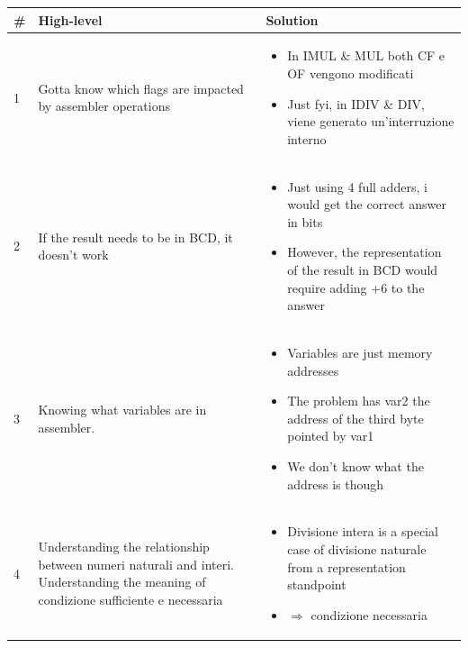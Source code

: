 \documentclass[a4paper,12pt]{article}
\begin{document}
\noindent\hspace*{-1.5cm}
    \begin{tabular}{|C{0.7cm}|C{8cm}|C{8cm}|}
        \hline
        \textbf{\#} & \textbf{High-level} & \textbf{Solution} \\
        \hline

        1
        &
        Gotta know which flags are impacted by assembler operations
        &
        \begin{itemize}[label=\(\rightarrow\)]
            \item In IMUL \& MUL both CF e OF vengono modificati
            \item Just fyi, in IDIV \& DIV, viene generato un'interruzione interno
        \end{itemize} 
        \\

        \hline

        2
        &
        If the result needs to be in BCD, it doesn't work
        &
         \begin{itemize}[label=\(\rightarrow\)]
            \item Just using 4 full adders, i would get the correct answer in bits
            \item However, the representation of the result in BCD would require adding +6 to the answer
        \end{itemize}
        \\

        \hline

        3
        &
        Knowing what variables are in assembler.
        &
         \begin{itemize}[label=\(\rightarrow\)]
            \item Variables are just memory addresses
            \item The problem has var2 the address of the third byte pointed by var1
            \item We don't know what the address is though 
        \end{itemize}
        \\


        \hline

        4
        &
        Understanding the relationship between numeri naturali and interi. Understanding the meaning of condizione sufficiente e necessaria         
        &
         \begin{itemize}[label=\(\rightarrow\)]
            \item Divisione intera is a special case of divisione naturale from a representation standpoint
            \item $\Rightarrow$ condizione necessaria 
        \end{itemize}
        \\


\end{tabular}
\end{document}
